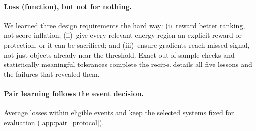 \paragraph{Loss (function), but not for nothing.}
We learned three design requirements the hard way: (i)~reward better ranking, not score inflation; (ii)~give every relevant energy region an explicit reward or protection, or it can be sacrificed; and (iii)~ensure gradients reach missed signal, not just objects already near the threshold. Exact out-of-sample checks and statistically meaningful tolerances complete the recipe.  details all five lessons and the failures that revealed them.

\paragraph{Pair learning follows the event decision.}
Average losses within eligible events and keep the selected systems fixed for
evaluation (\cref{app:pair_protocol}).
